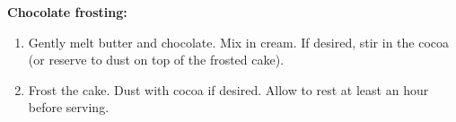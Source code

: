 \textbf{Chocolate frosting:}

\begin{ingredients}
\end{ingredients}


\begin{recipe}
  \begin{enumerate}

  \item Gently melt butter and chocolate.  Mix in cream.  If desired,
    stir in the cocoa (or reserve to dust on top of the frosted cake).

  \item Frost the cake.  Dust with cocoa if desired.  Allow to rest at
    least an hour before serving.

  \end{enumerate}
\end{recipe}

